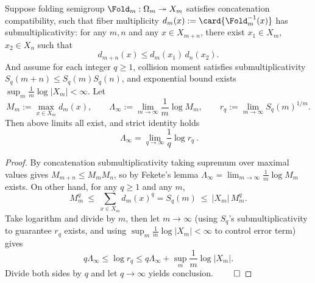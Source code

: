\begin{proposition}\label{prop:pom-maxfiber-exponent-equals-renyi-endpoint}
Suppose folding semigroup \(\Fold_m:\Omega_m\twoheadrightarrow X_m\) satisfies concatenation compatibility, such that fiber multiplicity
\(
d_m(x):=\card{\Fold_m^{-1}(x)}
\)
has submultiplicativity: for any \(m,n\) and any \(x\in X_{m+n}\), there exist \(x_1\in X_m\), \(x_2\in X_n\) such that
\[
d_{m+n}(x)\le d_m(x_1)\,d_n(x_2).
\]
And assume for each integer \(q\ge 1\), collision moment satisfies submultiplicativity \(S_q(m+n)\le S_q(m)S_q(n)\), and exponential bound exists
\(
\sup_m \frac{1}{m}\log|X_m|<\infty
\).
Let
\[
M_m:=\max_{x\in X_m} d_m(x),\qquad
\Lambda_\infty:=\lim_{m\to\infty}\frac{1}{m}\log M_m,\qquad
r_q:=\lim_{m\to\infty} S_q(m)^{1/m}.
\]
Then above limits all exist, and strict identity holds
\[
\boxed{\ \Lambda_\infty=\lim_{q\to\infty}\frac{1}{q}\log r_q\ }.
\]
\end{proposition}
\begin{proof}
By concatenation submultiplicativity taking supremum over maximal values gives \(M_{m+n}\le M_mM_n\), so by Fekete's lemma \(\Lambda_\infty=\lim_{m\to\infty}\frac{1}{m}\log M_m\) exists.
On other hand, for any \(q\ge 1\) and any \(m\),
\[
M_m^q\ \le\ \sum_{x\in X_m}d_m(x)^q=S_q(m)\ \le\ |X_m|\,M_m^q.
\]
Take logarithm and divide by \(m\), then let \(m\to\infty\) (using \(S_q\)'s submultiplicativity to guarantee \(r_q\) exists, and using \(\sup_m \frac{1}{m}\log|X_m|<\infty\) to control error term) gives
\[
q\Lambda_\infty\le \log r_q\le q\Lambda_\infty+\sup_m\frac{1}{m}\log|X_m|.
\]
Divide both sides by \(q\) and let \(q\to\infty\) yields conclusion. $\qed$
\end{proof}

